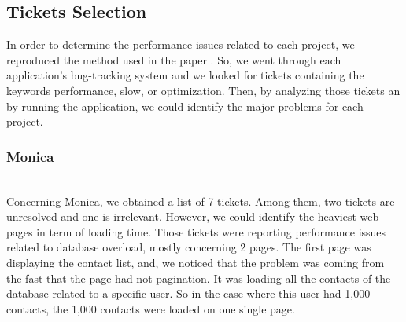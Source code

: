 \documentclass[sigconf]{acmart}
\begin{document}
\subsection{Tickets Selection}
In order to determine the performance issues related to each project, we reproduced the method used in the paper \cite{paper}. So, we went through each application's bug-tracking system and we looked for tickets containing the keywords performance, slow, or optimization. Then, by analyzing those tickets an by running the application, we could identify the major problems for each project.\\

\subsubsection{Monica}~\\
Concerning Monica, we obtained a list of 7 tickets. Among them, two tickets are unresolved and one is irrelevant. However, we could identify the heaviest web pages in term of loading time. Those tickets were reporting performance issues related to database overload, mostly concerning 2 pages. The first page was displaying the contact list, and, we noticed that the problem was coming from the fast that the page had not pagination. It was loading all the contacts of the database related to a specific user. So in the case where this user had 1,000 contacts, the 1,000 contacts were loaded on one single page.\\
\end{document}
